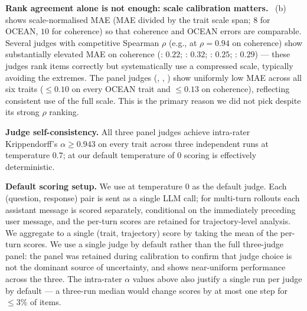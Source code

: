 \textbf{Rank agreement alone is not enough: scale calibration matters.}
~(b) shows scale-normalised MAE (MAE divided by the trait scale span; $8$ for OCEAN, $10$ for coherence) so that coherence and OCEAN errors are comparable. Several judges with competitive Spearman $\rho$ (e.g., \KimiKTwo at $\rho = 0.94$ on coherence) show substantially elevated MAE on coherence (\KimiKTwo: $0.22$; \GPTFiveMini: $0.32$; \GeminiTwoPointZeroFlash: $0.25$; \GPTFourPointOneNano: $0.29$) --- these judges rank items correctly but systematically use a compressed scale, typically avoiding the extremes. The panel judges (\QwenThreeSizeTwoThreeFiveB, \GemmaFourSizeTwentySixB, \LlamaThreePointThreeSizeSeventyBInstruct) show uniformly low MAE across all six traits ($\leq 0.10$ on every OCEAN trait and $\leq 0.13$ on coherence), reflecting consistent use of the full scale. This is the primary reason we did not pick \KimiKTwo despite its strong $\rho$ ranking.

\textbf{Judge self-consistency.}
All three panel judges achieve intra-rater Krippendorff's $\alpha \geq 0.943$ on every trait across three independent runs at temperature $0.7$; at our default temperature of $0$ scoring is effectively deterministic.

\textbf{Default scoring setup.}
We use \QwenThreeSizeTwoThreeFiveB at temperature $0$ as the default judge. Each (question, response) pair is sent as a single LLM call; for multi-turn rollouts each assistant message is scored separately, conditional on the immediately preceding user message, and the per-turn scores are retained for trajectory-level analysis. We aggregate to a single (trait, trajectory) score by taking the mean of the per-turn scores. We use a single judge by default rather than the full three-judge panel: the panel was retained during calibration to confirm that judge choice is not the dominant source of uncertainty, and  shows near-uniform performance across the three. The intra-rater $\alpha$ values above also justify a single run per judge by default --- a three-run median would change scores by at most one step for $\leq 3\%$ of items.


